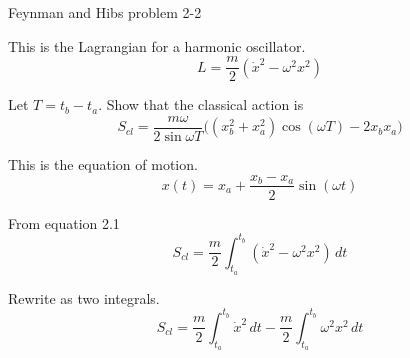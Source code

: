 \documentclass[12pt]{article}
\begin{document}
\noindent
Feynman and Hibs problem 2-2

\bigskip
\noindent
This is the Lagrangian for a harmonic oscillator.
\begin{equation*}
L=\frac{m}{2}(\dot{x}^2-\omega^2 x^2)
\end{equation*}

\noindent
Let $T=t_b-t_a$.
Show that the classical action is
\begin{equation*}
S_{cl}=\frac{m\omega}{2\sin\omega T}
\bigg((x_b^2+x_a^2)\cos(\omega T)-2x_b x_a\bigg)
\end{equation*}

\noindent
This is the equation of motion.
\begin{equation*}
x(t)=x_a+\frac{x_b-x_a}{2}\sin(\omega t)
\end{equation*}

\noindent
From equation 2.1
\begin{equation*}
S_{cl}=\frac{m}{2}\int_{t_a}^{t_b} (\dot{x}^2-\omega^2 x^2)\,dt
\end{equation*}

\noindent
Rewrite as two integrals.
\begin{equation*}
S_{cl}=\frac{m}{2}\int_{t_a}^{t_b} \dot{x}^2\,dt
-\frac{m}{2}\int_{t_a}^{t_b}\omega^2 x^2\,dt
\end{equation*}
\end{document}
